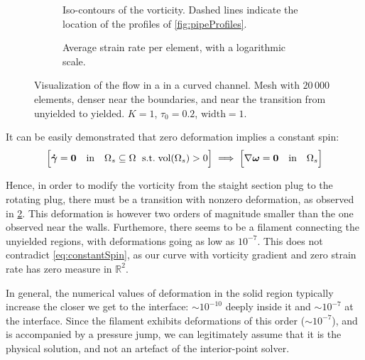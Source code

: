 \documentclass[11 pt]{report}
\begin{document}
\begin{figure}[!b]
    \centering
    \begin{subfigure}[t]{\textwidth}
        
        \caption{Iso-contours of the vorticity. Dashed lines indicate the location of the profiles of \cref{fig:pipeProfiles}.}
        \label{fig:pipeVorticity}
    \end{subfigure}
    \begin{subfigure}[t]{\textwidth}
        
        \caption{Average strain rate per element, with a logarithmic scale.}
        \label{fig:pipeStrain}
    \end{subfigure}
    \caption{Visualization of the flow in a in a curved channel. Mesh with $20\,000$ elements, denser near the boundaries, and near the transition from unyielded to yielded. $K=1$, $\tau_0=0.2$, $\text{width}=1$.}
    \label{fig:pipe}
\end{figure}

It can be easily demonstrated that zero deformation implies a constant spin:
\begin{equation}
    \Big[ \boldsymbol{\dot \gamma} = \mathbf{0} \quad\text{in}\quad \Omega_s \subseteq \Omega  \;\text{ s.t.}\; \textrm{vol}(\Omega_s) > 0 \Big] \implies \Big[ \nabla \boldsymbol\omega = \mathbf{0} \quad\text{in}\quad \Omega_s\Big]
    \label{eq:constantSpin}
\end{equation}

Hence, in order to modify the vorticity from the staight section plug to the rotating plug, there must be a transition with nonzero deformation, as observed in \cref{fig:pipeStrain}. This deformation is however two orders of magnitude smaller than the one observed near the walls. Furthemore, there seems to be a filament connecting the unyielded regions, with deformations going as low as $10^{-7}$. This does not contradict \cref{eq:constantSpin}, as our curve with vorticity gradient and zero strain rate has zero measure in $\mathbb{R}^2$.

In general, the numerical values of deformation in the solid region typically increase the closer we get to the interface: $\sim 10^{-10}$ deeply inside it and $\sim 10^{-7}$ at the interface. Since the filament exhibits deformations of this order ($\sim 10^{-7}$), and is accompanied by a pressure jump, we can legitimately assume that it is the physical solution, and not an artefact of the interior-point solver.
\end{document}
